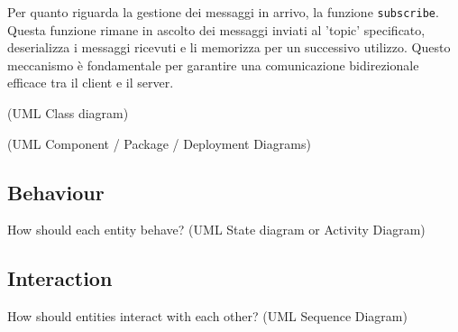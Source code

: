 Per quanto riguarda la gestione dei messaggi in arrivo, la funzione \texttt{subscribe}.
Questa funzione rimane in ascolto dei messaggi inviati al 'topic' specificato, deserializza i messaggi ricevuti e li memorizza per un successivo utilizzo.
Questo meccanismo è fondamentale per garantire una comunicazione bidirezionale efficace tra il client e il server.

%
(UML Class diagram)

%
(UML Component / Package / Deployment Diagrams)

\subsection{Behaviour}

How should each entity behave?
%
(UML State diagram or Activity Diagram)

\subsection{Interaction}

How should entities interact with each other?
%
(UML Sequence Diagram)
